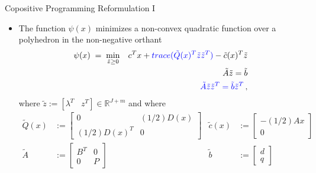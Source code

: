 \documentclass[xcolor=x11names,compress]{beamer}
\renewcommand{\(}{\begin{columns}}
\renewcommand{\)}{\end{columns}}
\newcommand{\<}[1]{\begin{column}{#1}}
\renewcommand{\>}{\end{column}}
\def\min{\mathop{\rm min}}
\newcommand{\0}{\V{0}}
\newcommand{\1}{\V{1}}
\renewcommand{\Re}{\mathbb{R}}
\newcommand{\trace}{\mathop{trace}}
\newcommand{\tQ}{\tilde{Q}(x)}
\newcommand{\tq}{\tilde{c}(x)}
\newcommand{\tA}{\tilde{A}}
\newcommand{\tb}{\tilde{b}}
\newcommand{\ty}{\tilde{z}}
\begin{document}
\begin{frame}{Copositive Programming Reformulation I}
\begin{itemize}
\item The function $\psi(x)$ minimizes a non-convex quadratic function over a polyhedron in the non-negative orthant
\begin{eqnarray*}
\psi(x) \;=\;\min_{\ty\geq 0} &&c^Tx+  {\color{blue} \trace(\tQ^T \ty\ty^T)}-\tq^T\ty\\
&&\tA \ty= \tb\\
&&{\color{blue} \tA \ty\ty^T= \tb\ty^T}\,,
\end{eqnarray*}
where $\ty:=[\lambda^T \;\;\;z^T]\in\Re^{J+m}$ and where
\begin{align*}
\tQ &:= \left[\begin{array}{cc}0 & (1/2)D(x) \\ (1/2)D(x)^T & 0  \end{array}\right] & \tq &:= \left[\begin{array}{c} -(1/2)A x\\ 0\end{array}\right]\\
\tA &:= \left[\begin{array}{cccc}B^T & 0 \\ 0 &P \end{array}\right] & \tb &:= \left[\begin{array}{c}d \\ q\end{array}\right]
\end{align*}
\end{itemize}
\end{frame}
\end{document}
